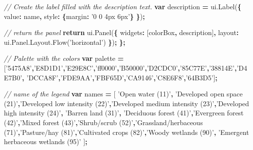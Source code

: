 \documentclass[]{article}
\newenvironment{Shaded}{\begin{snugshade}}{\end{snugshade}}
\newcommand{\KeywordTok}[1]{\textcolor[rgb]{0.13,0.29,0.53}{\textbf{#1}}}
\newcommand{\DataTypeTok}[1]{\textcolor[rgb]{0.13,0.29,0.53}{#1}}
\newcommand{\StringTok}[1]{\textcolor[rgb]{0.31,0.60,0.02}{#1}}
\newcommand{\CommentTok}[1]{\textcolor[rgb]{0.56,0.35,0.01}{\textit{#1}}}
\newcommand{\VariableTok}[1]{\textcolor[rgb]{0.00,0.00,0.00}{#1}}
\newcommand{\ControlFlowTok}[1]{\textcolor[rgb]{0.13,0.29,0.53}{\textbf{#1}}}
\newcommand{\OperatorTok}[1]{\textcolor[rgb]{0.81,0.36,0.00}{\textbf{#1}}}
\newcommand{\AttributeTok}[1]{\textcolor[rgb]{0.77,0.63,0.00}{#1}}
\newcommand{\NormalTok}[1]{#1}
\begin{document}
\begin{Shaded}
\begin{Highlighting}[]
      \CommentTok{// Create the label filled with the description text.}
      \KeywordTok{var}\NormalTok{ description }\OperatorTok{=} \VariableTok{ui}\NormalTok{.}\AttributeTok{Label}\NormalTok{(}\OperatorTok{\{}
        \DataTypeTok{value}\OperatorTok{:}\NormalTok{ name}\OperatorTok{,}
        \DataTypeTok{style}\OperatorTok{:} \OperatorTok{\{}\DataTypeTok{margin}\OperatorTok{:} \StringTok{'0 0 4px 6px'}\OperatorTok{\}}
      \OperatorTok{\}}\NormalTok{)}\OperatorTok{;}
      
      \CommentTok{// return the panel}
      \ControlFlowTok{return} \VariableTok{ui}\NormalTok{.}\AttributeTok{Panel}\NormalTok{(}\OperatorTok{\{}
        \DataTypeTok{widgets}\OperatorTok{:}\NormalTok{ [colorBox}\OperatorTok{,}\NormalTok{ description]}\OperatorTok{,}
        \DataTypeTok{layout}\OperatorTok{:} \VariableTok{ui}\NormalTok{.}\VariableTok{Panel}\NormalTok{.}\VariableTok{Layout}\NormalTok{.}\AttributeTok{Flow}\NormalTok{(}\StringTok{'horizontal'}\NormalTok{)}
      \OperatorTok{\}}\NormalTok{)}\OperatorTok{;}
\OperatorTok{\};}


\CommentTok{//  Palette with the colors}
\KeywordTok{var}\NormalTok{ palette }\OperatorTok{=}\NormalTok{[}\StringTok{'5475A8'}\OperatorTok{,}\StringTok{'E8D1D1'}\OperatorTok{,}\StringTok{'E29E8C'}\OperatorTok{,}\StringTok{'ff0000'}\OperatorTok{,}\StringTok{'B50000'}\OperatorTok{,}\StringTok{'D2CDC0'}\OperatorTok{,}\StringTok{'85C77E'}\OperatorTok{,}\StringTok{'38814E'}\OperatorTok{,}\StringTok{'D4E7B0'}\OperatorTok{,}
\StringTok{'DCCA8F'}\OperatorTok{,}\StringTok{'FDE9AA'}\OperatorTok{,}\StringTok{'FBF65D'}\OperatorTok{,}\StringTok{'CA9146'}\OperatorTok{,}\StringTok{'C8E6F8'}\OperatorTok{,}\StringTok{'64B3D5'}\NormalTok{]}\OperatorTok{;}
    

\CommentTok{// name of the legend}
\KeywordTok{var}\NormalTok{ names }\OperatorTok{=}\NormalTok{ [}
\StringTok{'Open water (11)'}\OperatorTok{,} \StringTok{'Developed open space (21)'}\OperatorTok{,}\StringTok{'Developed low intensity (22)'}\OperatorTok{,}\StringTok{'Developed medium intensity (23)'}\OperatorTok{,}\StringTok{'Developed high intensity (24)'}\OperatorTok{,} \StringTok{'Barren land (31)'}\OperatorTok{,} \StringTok{'Deciduous forest (41)'}\OperatorTok{,}\StringTok{'Evergreen forest (42)'}\OperatorTok{,}\StringTok{'Mixed forest (43)'}\OperatorTok{,}\StringTok{'Shrub/scrub (52)'}\OperatorTok{,}\StringTok{'Grassland/herbaceous (71)'}\OperatorTok{,}\StringTok{'Pasture/hay (81)'}\OperatorTok{,}\StringTok{'Cultivated crops (82)'}\OperatorTok{,}\StringTok{'Woody wetlands (90)'}\OperatorTok{,} \StringTok{'Emergent herbaceous wetlands (95)'}
\NormalTok{]}\OperatorTok{;}


\end{Highlighting}
\end{Shaded}
\end{document}
